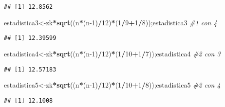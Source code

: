 \documentclass[
]{article}
\newenvironment{Shaded}{\begin{snugshade}}{\end{snugshade}}
\newcommand{\CommentTok}[1]{\textcolor[rgb]{0.56,0.35,0.01}{\textit{#1}}}
\newcommand{\DecValTok}[1]{\textcolor[rgb]{0.00,0.00,0.81}{#1}}
\newcommand{\FunctionTok}[1]{\textcolor[rgb]{0.13,0.29,0.53}{\textbf{#1}}}
\newcommand{\NormalTok}[1]{#1}
\newcommand{\OtherTok}[1]{\textcolor[rgb]{0.56,0.35,0.01}{#1}}
\newcommand{\SpecialCharTok}[1]{\textcolor[rgb]{0.81,0.36,0.00}{\textbf{#1}}}
\begin{document}
\begin{verbatim}
## [1] 12.8562
\end{verbatim}

\begin{Shaded}
\begin{Highlighting}[]
\NormalTok{estadistica3}\OtherTok{\textless{}{-}}\NormalTok{zk}\SpecialCharTok{*}\FunctionTok{sqrt}\NormalTok{((n}\SpecialCharTok{*}\NormalTok{(n}\DecValTok{{-}1}\NormalTok{)}\SpecialCharTok{/}\DecValTok{12}\NormalTok{)}\SpecialCharTok{*}\NormalTok{(}\DecValTok{1}\SpecialCharTok{/}\DecValTok{9}\SpecialCharTok{+}\DecValTok{1}\SpecialCharTok{/}\DecValTok{8}\NormalTok{));estadistica3  }\CommentTok{\#1 con 4}
\end{Highlighting}
\end{Shaded}

\begin{verbatim}
## [1] 12.39599
\end{verbatim}

\begin{Shaded}
\begin{Highlighting}[]
\NormalTok{estadistica4}\OtherTok{\textless{}{-}}\NormalTok{zk}\SpecialCharTok{*}\FunctionTok{sqrt}\NormalTok{((n}\SpecialCharTok{*}\NormalTok{(n}\DecValTok{{-}1}\NormalTok{)}\SpecialCharTok{/}\DecValTok{12}\NormalTok{)}\SpecialCharTok{*}\NormalTok{(}\DecValTok{1}\SpecialCharTok{/}\DecValTok{10}\SpecialCharTok{+}\DecValTok{1}\SpecialCharTok{/}\DecValTok{7}\NormalTok{));estadistica4  }\CommentTok{\#2 con 3}
\end{Highlighting}
\end{Shaded}

\begin{verbatim}
## [1] 12.57183
\end{verbatim}

\begin{Shaded}
\begin{Highlighting}[]
\NormalTok{estadistica5}\OtherTok{\textless{}{-}}\NormalTok{zk}\SpecialCharTok{*}\FunctionTok{sqrt}\NormalTok{((n}\SpecialCharTok{*}\NormalTok{(n}\DecValTok{{-}1}\NormalTok{)}\SpecialCharTok{/}\DecValTok{12}\NormalTok{)}\SpecialCharTok{*}\NormalTok{(}\DecValTok{1}\SpecialCharTok{/}\DecValTok{10}\SpecialCharTok{+}\DecValTok{1}\SpecialCharTok{/}\DecValTok{8}\NormalTok{));estadistica5  }\CommentTok{\#2 con 4}
\end{Highlighting}
\end{Shaded}

\begin{verbatim}
## [1] 12.1008
\end{verbatim}
\end{document}
